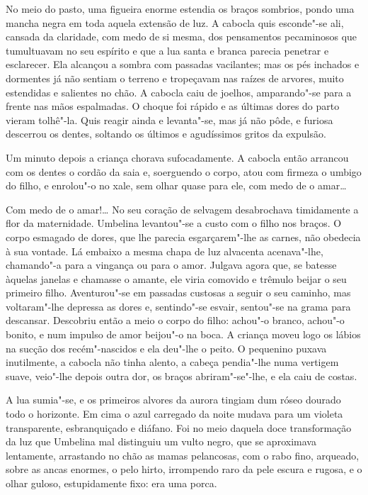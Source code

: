 No meio do pasto, uma figueira enorme estendia os braços sombrios, pondo
uma mancha negra em toda aquela extensão de luz. A cabocla quis
esconde"-se ali, cansada da claridade, com medo de si mesma, dos
pensamentos pecaminosos que tumultuavam no seu espírito e que a lua
santa e branca parecia penetrar e esclarecer. Ela alcançou a sombra com
passadas vacilantes; mas os pés inchados e dormentes já não sentiam o
terreno e tropeçavam nas raízes de arvores, muito estendidas e salientes
no chão. A cabocla caiu de joelhos, amparando"-se para a frente nas mãos
espalmadas. O choque foi rápido e as últimas dores do parto vieram
tolhê"-la. Quis reagir ainda e levanta"-se, mas já não pôde, e furiosa
descerrou os dentes, soltando os últimos e agudíssimos gritos da
expulsão.

Um minuto depois a criança chorava sufocadamente. A cabocla então
arrancou com os dentes o cordão da saia e, soerguendo o corpo, atou com
firmeza o umbigo do filho, e enrolou"-o no xale, sem olhar quase para
ele, com medo de o amar\ldots{}

Com medo de o amar!\ldots{} No seu coração de selvagem desabrochava
timidamente a flor da maternidade. Umbelina levantou"-se a custo com o
filho nos braços. O corpo esmagado de dores, que lhe parecia
esgarçarem"-lhe as carnes, não obedecia à sua vontade. Lá embaixo a mesma
chapa de luz alvacenta acenava"-lhe, chamando"-a para a vingança ou para o
amor. Julgava agora que, se batesse àquelas janelas e chamasse o amante,
ele viria comovido e trêmulo beijar o seu primeiro filho. Aventurou"-se
em passadas custosas a seguir o seu caminho, mas voltaram"-lhe depressa
as dores e, sentindo"-se esvair, sentou"-se na grama para descansar.
Descobriu então a meio o corpo do filho: achou"-o branco, achou"-o bonito,
e num impulso de amor beijou"-o na boca. A criança moveu logo os lábios
na sucção dos recém"-nascidos e ela deu"-lhe o peito. O pequenino puxava
inutilmente, a cabocla não tinha alento, a cabeça pendia"-lhe numa
vertigem suave, veio"-lhe depois outra dor, os braços abriram"-se"-lhe, e
ela caiu de costas.

A lua sumia"-se, e os primeiros alvores da aurora tingiam dum róseo
dourado todo o horizonte. Em cima o azul carregado da noite mudava para
um violeta transparente, esbranquiçado e diáfano. Foi no meio daquela
doce transformação da luz que Umbelina mal distinguiu um vulto negro,
que se aproximava lentamente, arrastando no chão as mamas pelancosas,
com o rabo fino, arqueado, sobre as ancas enormes, o pelo hirto,
irrompendo raro da pele escura e rugosa, e o olhar guloso, estupidamente
fixo: era uma porca.

